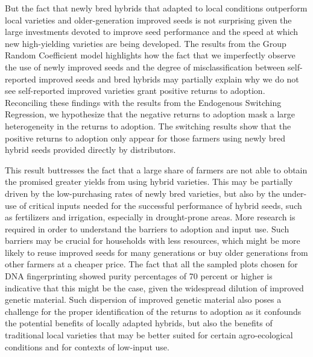 \documentclass[11pt]{article}
\begin{document}
But the fact that newly bred hybrids that adapted to local conditions outperform local varieties and older-generation improved seeds is not surprising given the large investments devoted to improve seed performance and the speed at which new high-yielding varieties are being developed. The results from the Group Random Coefficient model highlights how the fact that we imperfectly observe the use of newly improved seeds and the degree of misclassification between self-reported improved seeds and bred hybrids may partially explain why we do not see self-reported improved varieties grant positive returns to adoption. Reconciling these findings with the results from the Endogenous Switching Regression, we hypothesize that the negative returns to adoption mask a large heterogeneity in the returns to adoption. The switching results show that the positive returns to adoption only appear for those farmers using newly bred hybrid seeds provided directly by distributors. 

This result buttresses the fact that a large share of farmers are not able to obtain the promised greater yields from using hybrid varieties. This may be partially driven by the low-purchasing rates of newly bred varieties, but also by the under-use of critical inputs needed for the successful performance of hybrid seeds, such as fertilizers and irrigation, especially in drought-prone areas. More research is required in order to understand the barriers to adoption and input use. Such barriers may be crucial for households with less resources, which might be more likely to reuse improved seeds for many generations or buy older generations from other farmers at a cheaper price. The fact that all the sampled plots chosen for DNA fingerprinting showed purity percentages of 70 percent or higher is indicative that this might be the case, given the widespread dilution of improved genetic material. Such dispersion of improved genetic material also poses a challenge for the proper identification of the returns to adoption as it confounds the potential benefits of locally adapted hybrids, but also the benefits of traditional local varieties that may be better suited for certain agro-ecological conditions and for contexts of low-input use.  
\end{document}
